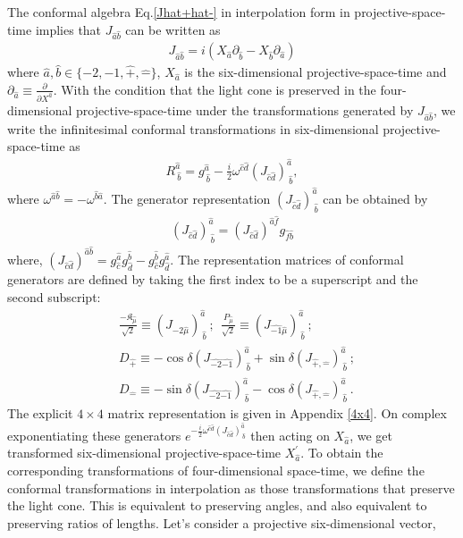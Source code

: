 \documentclass[%
 reprint,
superscriptaddress,
 amsmath,amssymb,
 aps,
]{revtex4-2}
\begin{document}
The conformal algebra Eq.\eqref{Jhat+hat-} in interpolation form in projective-space-time implies that $J_{\hat{a}\hat{b}}$ can be written as
\begin{align}
    J_{\hat{a}\hat{b}}=i(X_{\hat{a}}\partial_{\hat{b}}-X_{\hat{b}}\partial_{\hat{a}})
\end{align}
where $\hat{a},\hat{b}\in\{-2,-1,\hat{+},\hat{-}\}$, $X_{\hat{a}}$ is the six-dimensional projective-space-time and $\partial_{\hat{a}}\equiv\frac{\partial}{\partial X^{\hat{a}}}$. With the condition that the light cone is preserved in the four-dimensional projective-space-time under the transformations generated by $ J_{\hat{a}\hat{b}}$, we write the infinitesimal conformal transformations in six-dimensional projective-space-time as
\begin{align}
    R^{\hat{a}}_{~\hat{b}}=g^{\hat{a}}_{~\hat{b}}-\frac{i}{2}\omega^{\hat{c}\hat{d}}(J_{\hat{c}\hat{d}})^{\hat{a}}_{~\hat{b}},
\end{align}
where $\omega^{\hat{a}\hat{b}}=-\omega^{\hat{b}\hat{a}}$. The generator representation $(J_{\hat{c}\hat{d}})^{\hat{a}}_{~\hat{b}}$ can be obtained by
\begin{align}
    (J_{\hat{c}\hat{d}})^{\hat{a}}_{~\hat{b}}=(J_{\hat{c}\hat{d}})^{\hat{a}\hat{f}}g_{\hat{f}\hat{b}}
\end{align}
where, $(J_{{\hat{c}}{\hat{d}}})^{{\hat{a}}{\hat{b}}}=g_{\hat{c}}^{\hat{a}} g_{\hat{d}}^{\hat{b}}-g_{\hat{c}}^{\hat{b}} g_{\hat{d}}^{\hat{a}}$. The representation matrices of conformal generators are defined by taking the first  index to be a superscript and the second subscript:
\begin{align}
    &\frac{-\mathfrak{K}_{\hat{\mu}}}{\sqrt{2}}\equiv (J_{\hat{-2}\hat{\mu}})^{\hat{a}}_{~\hat{b}}~;~~\frac{P_{\hat{\mu}}}{\sqrt{2}}\equiv (J_{\hat{-1}\hat{\mu}})^{\hat{a}}_{~\hat{b}}~;\nonumber\\
    &D_{\hat{+}}\equiv -\cos{\delta}(J_{\hat{-2}\hat{-1}})^{\hat{a}}_{~\hat{b}}+\sin{\delta}(J_{\hat{+},\hat{-}})^{\hat{a}}_{~\hat{b}}~;\nonumber\\
    &D_{\hat{-}}\equiv -\sin{\delta}(J_{\hat{-2}\hat{-1}})^{\hat{a}}_{~\hat{b}}-\cos{\delta}(J_{\hat{+},\hat{-}})^{\hat{a}}_{~\hat{b}}~.\label{implicit6x6}
\end{align}
The explicit $4\times4$ matrix representation is given in Appendix \ref{4x4}. On complex exponentiating these generators $e^{-\frac{i}{2}\omega^{\hat{c}\hat{d}}(J_{\hat{c}\hat{d}})^{\hat{a}}_{~\hat{b}}}$ then acting on $X_{\hat{a}}$, we get transformed six-dimensional projective-space-time $X^{\prime}_{\hat{a}}$. To obtain the corresponding transformations of four-dimensional space-time, we define the conformal transformations in interpolation as those transformations that preserve the light cone. This is equivalent to preserving angles, and also equivalent to preserving ratios of lengths. Let's consider a projective six-dimensional vector,
\end{document}
